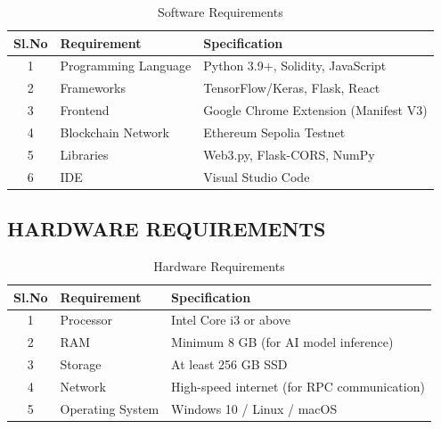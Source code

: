 \begin{table}[htbp]
\centering
\renewcommand{\arraystretch}{1.5}
\begin{tabular}{|c|l|l|}
\hline
\textbf{Sl.No} & \textbf{Requirement} & \textbf{Specification} \\
\hline
1 & Programming Language & Python 3.9+, Solidity, JavaScript \\
\hline
2 & Frameworks & TensorFlow/Keras, Flask, React \\
\hline
3 & Frontend & Google Chrome Extension (Manifest V3) \\
\hline
4 & Blockchain Network & Ethereum Sepolia Testnet \\
\hline
5 & Libraries & Web3.py, Flask-CORS, NumPy \\
\hline
6 & IDE & Visual Studio Code \\
\hline
\end{tabular}
\caption{Software Requirements}
\end{table}

\subsection{HARDWARE REQUIREMENTS}

\begin{table}[htbp]
\centering
\renewcommand{\arraystretch}{1.5}
\begin{tabular}{|c|l|l|}
\hline
\textbf{Sl.No} & \textbf{Requirement} & \textbf{Specification} \\
\hline
1 & Processor & Intel Core i3 or above \\
\hline
2 & RAM & Minimum 8 GB (for AI model inference) \\
\hline
3 & Storage & At least 256 GB SSD \\
\hline
4 & Network & High-speed internet (for RPC communication) \\
\hline
5 & Operating System & Windows 10 / Linux / macOS \\
\hline
\end{tabular}
\caption{Hardware Requirements}
\end{table}

